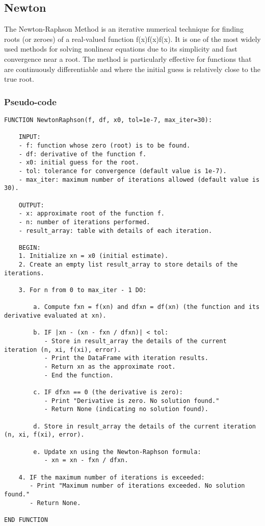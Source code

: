 \documentclass{article}
\begin{document}
    \subsection{Newton}
        The Newton-Raphson Method is an iterative numerical technique for finding roots (or zeroes) of a real-valued
        function f(x)f(x)f(x). It is one of the most widely used methods for solving nonlinear equations due to its
        simplicity and fast convergence near a root. The method is particularly effective for functions that are
        continuously differentiable and where the initial guess is relatively close to the true root.

        \subsubsection{Pseudo-code}
\begin{lstlisting}
FUNCTION NewtonRaphson(f, df, x0, tol=1e-7, max_iter=30):

    INPUT:
    - f: function whose zero (root) is to be found.
    - df: derivative of the function f.
    - x0: initial guess for the root.
    - tol: tolerance for convergence (default value is 1e-7).
    - max_iter: maximum number of iterations allowed (default value is 30).

    OUTPUT:
    - x: approximate root of the function f.
    - n: number of iterations performed.
    - result_array: table with details of each iteration.

    BEGIN:
    1. Initialize xn = x0 (initial estimate).
    2. Create an empty list result_array to store details of the iterations.

    3. For n from 0 to max_iter - 1 DO:

        a. Compute fxn = f(xn) and dfxn = df(xn) (the function and its derivative evaluated at xn).

        b. IF |xn - (xn - fxn / dfxn)| < tol:
           - Store in result_array the details of the current iteration (n, xi, f(xi), error).
           - Print the DataFrame with iteration results.
           - Return xn as the approximate root.
           - End the function.

        c. IF dfxn == 0 (the derivative is zero):
           - Print "Derivative is zero. No solution found."
           - Return None (indicating no solution found).

        d. Store in result_array the details of the current iteration (n, xi, f(xi), error).

        e. Update xn using the Newton-Raphson formula:
           - xn = xn - fxn / dfxn.

    4. IF the maximum number of iterations is exceeded:
       - Print "Maximum number of iterations exceeded. No solution found."
       - Return None.

END FUNCTION
\end{lstlisting}
\end{document}

